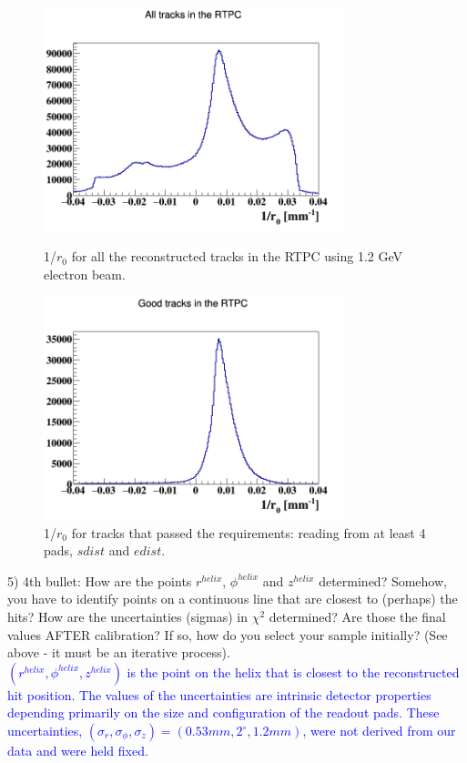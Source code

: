 \begin{figure}[tbp]
\hspace{-1cm}
\begin{minipage}[c]{.46\linewidth}
\includegraphics[height=6.5cm]{fig/rtpc_1overr0_all_before.png}
\caption{1/$r_{0}$ for all the reconstructed tracks in the RTPC using 1.2 GeV 
electron beam.}
\label{fig:1overr0}
\end{minipage} \hfill
\begin{minipage}[c]{.46\linewidth}
\hspace{-0.1in}\includegraphics[height=6.5cm]{fig/rtpc_1overr0_all.png}
\caption{1/$r_{0}$ for tracks that passed the requirements: reading from at 
least 4 pads, $sdist$ and $edist$.}
\label{fig:good_r0}
\end{minipage}
\end{figure}


5) 4th bullet: How are the points $r^{helix}$, $\phi^{helix}$ and $z^{helix}$ 
determined?  Somehow, you have to identify points on a continuous line that are 
closest to (perhaps) the hits? How are the uncertainties (sigmas) in  
$\chi^{2}$ determined?  Are those the final values AFTER calibration? If so, 
how do you select your sample initially? (See above - it must be an iterative 
process).  \\
\textcolor{blue}{$(r^{helix},\phi^{helix},z^{helix})$ is the point
on the helix that is closest to the reconstructed hit position.
The values of the uncertainties are intrinsic detector properties depending
primarily on the size and configuration of the readout pads. These 
uncertainties, $(\sigma_{r}, \sigma_{\phi}, \sigma_{z}) = (0.53 mm, 2^{\circ}, 
1.2 mm)$, were not derived from our data and were held fixed.} \\

